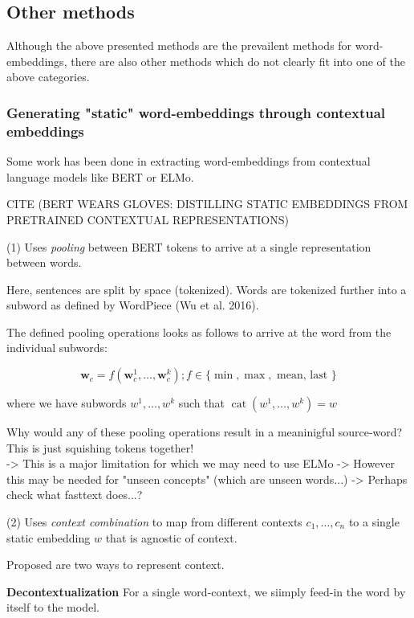\documentclass[a4paper,12pt,twoside,openright]{report}
\begin{document}
\subsection{Other methods}

Although the above presented methods are the prevailent methods for word-embeddings, there are also other methods which do not clearly fit into one of the above categories.

\subsubsection{Generating "static" word-embeddings through contextual embeddings}

Some work has been done in extracting word-embeddings from contextual language models like BERT or ELMo.

CITE (BERT WEARS GLOVES: DISTILLING STATIC EMBEDDINGS FROM PRETRAINED CONTEXTUAL REPRESENTATIONS)

(1) Uses \textit{pooling} between BERT tokens to arrive at a single representation between words.

Here, sentences are split by space (tokenized).
Words are tokenized further into a subword as defined by WordPiece (Wu et al. 2016).

The defined pooling operations looks as follows to arrive at the word from the individual subwords:

$$
\mathbf{w}_{c}=f\left(\mathbf{w}_{c}^{1}, \ldots, \mathbf{w}_{c}^{k}\right) ; f \in\{\min , \max , \text { mean, last }\}
$$

where we have subwords $w^{1},  \ldots, w^{k}$ such that $\operatorname{cat}\left(w^{1}, \ldots, w^{k}\right)=w$

Why would any of these pooling operations result in a meaninigful source-word? 
This is just squishing tokens together! \\

-> This is a major limitation for which we may need to use ELMo
-> However this may be needed for "unseen concepts" (which are unseen words...)
-> Perhaps check what fasttext does...?


(2) Uses \textit{context combination} to map from different contexts $c_1, \ldots, c_n$ to a single static embedding $w$ that is agnostic of context.

Proposed are two ways to represent context.

\textbf{Decontextualization} For a single word-context, we siimply feed-in the word by itself to the model.
\end{document}
